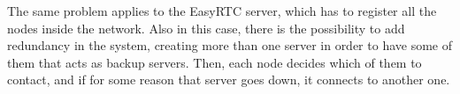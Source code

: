 The same problem applies to the EasyRTC server, which has to register all the nodes inside the network. Also in this case, there is the possibility to add redundancy in the system, creating more than one server in order to have some of them that acts as backup servers. Then, each node decides which of them to contact, and if for some reason that server goes down, it connects to another one. 
